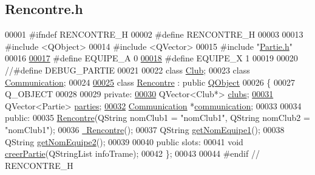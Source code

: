 \hypertarget{_rencontre_8h_source}{}\subsection{Rencontre.\+h}

\begin{DoxyCode}
00001 \textcolor{preprocessor}{#ifndef RENCONTRE\_H}
00002 \textcolor{preprocessor}{#define RENCONTRE\_H}
00003 
00013 \textcolor{preprocessor}{#include <QObject>}
00014 \textcolor{preprocessor}{#include <QVector>}
00015 \textcolor{preprocessor}{#include "\hyperlink{_partie_8h}{Partie.h}"}
00016 
\hyperlink{_rencontre_8h_ab4f4f1173fbbb2f1f27e2b18c5de79dc}{00017} \textcolor{preprocessor}{#define EQUIPE\_A    0}
\hyperlink{_rencontre_8h_abee6bce8b9cc687177c72a76428afcff}{00018} \textcolor{preprocessor}{#define EQUIPE\_X    1}
00019 
00020 \textcolor{comment}{//#define DEBUG\_PARTIE}
00021 
00022 \textcolor{keyword}{class }\hyperlink{class_club}{Club};
00023 \textcolor{keyword}{class }\hyperlink{class_communication}{Communication};
00024 
\hyperlink{class_rencontre}{00025} \textcolor{keyword}{class }\hyperlink{class_rencontre}{Rencontre} : \textcolor{keyword}{public} \hyperlink{class_q_object}{QObject}
00026 \{
00027     Q\_OBJECT
00028 
00029 \textcolor{keyword}{private}:
\hyperlink{class_rencontre_a12f6cef62070ecb095971e704a9d92a6}{00030}     QVector<Club*> \hyperlink{class_rencontre_a12f6cef62070ecb095971e704a9d92a6}{clubs};
\hyperlink{class_rencontre_a6b52ccf9b5d083718928b207ae5316fe}{00031}     QVector<Partie> \hyperlink{class_rencontre_a6b52ccf9b5d083718928b207ae5316fe}{parties};
\hyperlink{class_rencontre_a843a1b93c1cb909f2706c6f81438661e}{00032}     \hyperlink{class_communication}{Communication} *\hyperlink{class_rencontre_a843a1b93c1cb909f2706c6f81438661e}{communication};
00033 
00034 \textcolor{keyword}{public}:
00035     \hyperlink{class_rencontre_aab1bbf3ea211e00186ab7f866994b77a}{Rencontre}(QString nomClub1 = \textcolor{stringliteral}{"nomClub1"}, QString nomClub2 = \textcolor{stringliteral}{"nomClub1"});
00036     \hyperlink{class_rencontre_a437de7d5f9adced5124dcfdd13e504d3}{~Rencontre}();
00037     QString \hyperlink{class_rencontre_a50df24caf57437d8eaaadae43ff846ec}{getNomEquipe1}();
00038     QString \hyperlink{class_rencontre_ac544f97755480e0e2718d0802d308585}{getNomEquipe2}();
00039 
00040 \textcolor{keyword}{public} slots:
00041     \textcolor{keywordtype}{void} \hyperlink{class_rencontre_a8eb8eb61ed543925626e7680a1ecef5b}{creerPartie}(QStringList infoTrame);
00042 \};
00043 
00044 \textcolor{preprocessor}{#endif // RENCONTRE\_H}
\end{DoxyCode}
